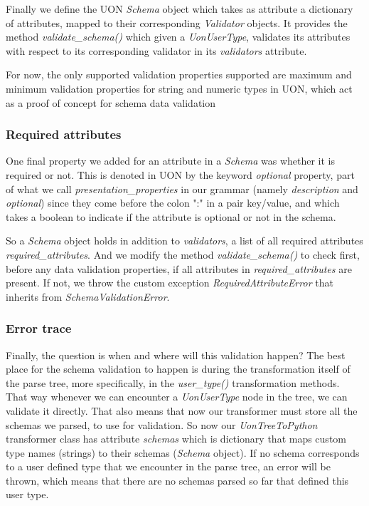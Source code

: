 \documentclass[12pt]{article}
\begin{document}
Finally we define the UON \emph{Schema} object which takes as attribute a dictionary of attributes, mapped to their corresponding \emph{Validator} objects. It provides the method \emph{validate\_schema()} which given a \emph{UonUserType}, validates its attributes with respect to its corresponding validator in its \emph{validators} attribute.

For now, the only supported validation properties supported are maximum and minimum validation properties for string and numeric types in UON, which act as a proof of concept for schema data validation

\subsubsection{Required attributes}
One final property we added for an attribute in a \emph{Schema} was whether it is required or not. This is denoted in UON by the keyword \emph{optional} property, part of what we call \emph{presentation\_properties} in our grammar (namely \emph{description} and \emph{optional}) since they come before the colon ":" in a pair key/value, and which takes a boolean to indicate if the attribute is optional or not in the schema.

So a \emph{Schema} object holds in addition to \emph{validators}, a list of all required attributes \emph{required\_attributes}. And we modify the method \emph{validate\_schema()} to check first, before any data validation properties, if all attributes in \emph{required\_attributes} are present. If not, we throw the custom exception \emph{RequiredAttributeError} that inherits from \emph{SchemaValidationError}.

\subsubsection{Error trace}
Finally, the question is when and where will this validation happen? The best place for the schema validation to happen is during the transformation itself of the parse tree, more specifically, in the \emph{user\_type()} transformation methods. That way whenever we can encounter a \emph{UonUserType} node in the tree, we can validate it directly. That also means that now our transformer must store all the schemas we parsed, to use for validation. So now our \emph{UonTreeToPython} transformer class has attribute \emph{schemas} which is dictionary that maps custom type names (strings) to their schemas (\emph{Schema} object). If no schema corresponds to a user defined type that we encounter in the parse tree, an error will be thrown, which means that there are no schemas parsed so far that defined this user type.
\end{document}
